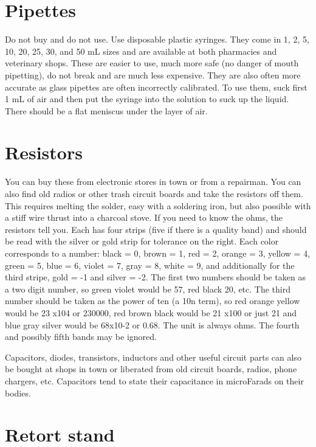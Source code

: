 \section{Pipettes}
Do not buy and do not use. 
Use disposable plastic syringes. 
They come in 1, 
2, 
5, 
10, 
20, 
25, 
30, 
and 50 mL sizes and are available at both pharmacies and veterinary shops. 
These are easier to use, 
much more safe (no danger of mouth pipetting), 
do not break and are much less expensive. 
They are also often more accurate 
as glass pipettes are often incorrectly calibrated. 
To use them, 
suck first 1  mL of air and then put the syringe into the solution to suck up the liquid. 
There should be a flat meniscus under the layer of air.

\section{Resistors}
You can buy these from electronic stores in town or from a repairman. 
You can also find old radios or other trash circuit boards 
and take the resistors off them. 
This requires melting the solder, 
easy with a soldering iron, 
but also possible with a stiff wire thrust into a charcoal stove. 
If you need to know the ohms, 
the resistors tell you. 
Each has four strips (five if there is a quality band) 
and should be read with the silver or gold strip for tolerance on the right. 
Each color corresponds to a number: black = 0, 
brown = 1, 
red = 2, 
orange = 3, 
yellow = 4, 
green = 5, 
blue = 6, 
violet = 7, 
gray = 8, 
white = 9, 
and additionally for the third stripe, 
gold = -1 and silver = -2. 
The first two numbers should be taken as a two digit number, 
so green violet would be 57, 
red black 20, 
etc. 
The third number should be taken as the power of ten (a 10n term), 
so red orange yellow would be 23 x104 or 230000, 
red brown black would be 21 x100 or just 21 
and blue gray silver would be 68x10-2 or 0.68. 
The unit is always ohms. 
The fourth and possibly fifth bands may be ignored.

Capacitors, 
diodes, 
transistors, 
inductors and other useful circuit parts can also be bought 
at shops in town or liberated from old circuit boards, 
radios, 
phone chargers, 
etc. 
Capacitors tend to state their capacitance in microFarads on their bodies.

\section{Retort stand}

